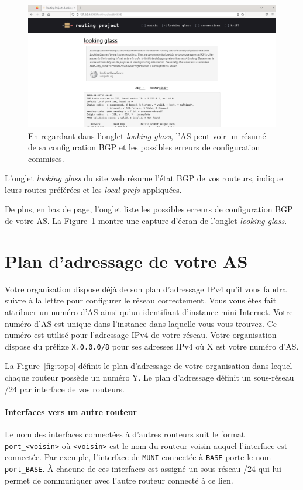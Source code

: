 \documentclass[a4paper, 11pt]{article}
\begin{document}
\begin{figure}
    \centering
    \includegraphics[width=0.8\linewidth]{figures/looking-glass-screenshot.png}
    \caption{En regardant dans l'onglet \textit{looking glass}, l'AS peut voir
    un résumé de sa configuration BGP et les possibles erreurs de configuration
    commises.}
    \label{fig:looking-glass-screenshot}
\end{figure}

L'onglet \textit{looking glass} du site web résume l'état BGP de vos routeurs,
indique leurs routes préférées et les \textit{local prefs} appliquées.

De plus, en bas de page, l'onglet liste les possibles erreurs de configuration
BGP de votre AS. La Figure~\ref{fig:looking-glass-screenshot} montre une capture
d'écran de l'onglet \textit{looking glass}.


\section{Plan d'adressage de votre AS}\label{sec:plan-adressage}

Votre organisation dispose déjà de son plan d'adressage IPv4 qu'il
vous faudra suivre à la lettre pour configurer le réseau correctement.
Vous vous êtes fait attribuer un numéro d'AS ainsi qu'un identifiant
d'instance mini-Internet. Votre numéro d'AS est unique dans l'instance
dans laquelle vous vous trouvez. Ce numéro est utilisé pour l'adressage
IPv4 de votre réseau. Votre organisation dispose du préfixe
\texttt{X.0.0.0/8} pour ses adresses IPv4 où X est votre numéro d'AS.

La Figure~\ref{fig:topo} définit le plan d'adressage de votre organisation
dans lequel chaque routeur possède un numéro Y. Le plan d'adressage
définit un sous-réseau /24 par interface de vos routeurs.

\paragraph*{Interfaces vers un autre routeur}
Le nom des interfaces
connectées à d'autres routeurs suit le format \texttt{port\_<voisin>}
où \texttt{<voisin>} est le nom du routeur voisin auquel l'interface
est connectée. Par exemple, l'interface de \texttt{MUNI} connectée à
\texttt{BASE} porte le nom \texttt{port\_BASE}.
À chacune de ces interfaces est assigné un sous-réseau /24 qui lui permet
de communiquer avec l'autre routeur connecté à ce lien.
\end{document}
